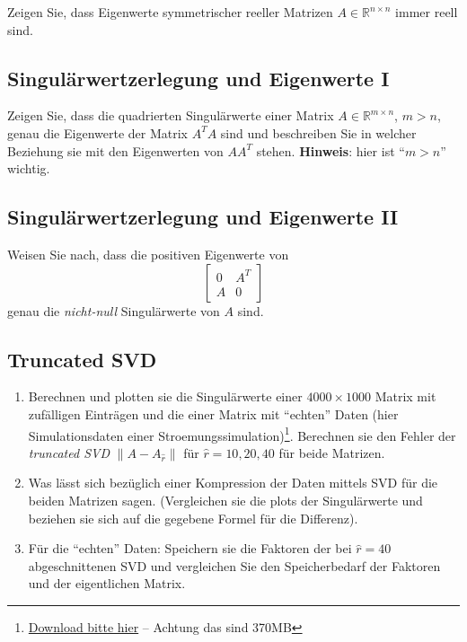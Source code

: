 \documentclass[
]{book}
\providecommand{\tightlist}{%
  \setlength{\itemsep}{0pt}\setlength{\parskip}{0pt}}
\theoremstyle{definition}
\theoremstyle{definition}
\theoremstyle{definition}
\theoremstyle{definition}
\theoremstyle{remark}
\begin{document}
Zeigen Sie, dass Eigenwerte symmetrischer reeller Matrizen \(A\in \mathbb R^{n\times n}\) immer reell sind.

\hypertarget{singuluxe4rwertzerlegung-und-eigenwerte-i}{%
\subsection{Singulärwertzerlegung und Eigenwerte I}\label{singuluxe4rwertzerlegung-und-eigenwerte-i}}

Zeigen Sie, dass die quadrierten Singulärwerte einer Matrix \(A\in \mathbb R^{m\times n}\), \(m>n\), genau die Eigenwerte der Matrix \(A^TA\) sind und beschreiben Sie in welcher Beziehung sie mit den Eigenwerten von \(AA^T\) stehen. \textbf{Hinweis}: hier ist ``\(m>n\)'' wichtig.

\hypertarget{singuluxe4rwertzerlegung-und-eigenwerte-ii}{%
\subsection{Singulärwertzerlegung und Eigenwerte II}\label{singuluxe4rwertzerlegung-und-eigenwerte-ii}}

Weisen Sie nach, dass die positiven Eigenwerte von
\begin{equation*}
\begin{bmatrix}
0 & A^T \\ A & 0
\end{bmatrix}
\end{equation*}
genau die \emph{nicht-null} Singulärwerte von \(A\) sind.

\hypertarget{truncated-svd}{%
\subsection{Truncated SVD}\label{truncated-svd}}

\begin{enumerate}
\def\labelenumi{\arabic{enumi}.}
\tightlist
\item
  Berechnen und plotten sie die Singulärwerte einer \(4000\times 1000\) Matrix mit zufälligen Einträgen und die einer Matrix mit ``echten'' Daten (hier Simulationsdaten einer Stroemungssimulation)\footnote{ \href{https://cloud.tu-ilmenau.de/s/pAMyTmK5YA5t9dg}{Download bitte hier} -- Achtung das sind 370MB}. Berechnen sie den Fehler der \emph{truncated SVD} \(\|A-A_{\hat r}\|\) für \(\hat r = 10, 20, 40\) für beide Matrizen.
\item
  Was lässt sich bezüglich einer Kompression der Daten mittels SVD für die beiden Matrizen sagen. (Vergleichen sie die plots der Singulärwerte und beziehen sie sich auf die gegebene Formel für die Differenz).
\item
  Für die ``echten'' Daten: Speichern sie die Faktoren der bei \(\hat r=40\) abgeschnittenen SVD und vergleichen Sie den Speicherbedarf der Faktoren und der eigentlichen Matrix.
\end{enumerate}
\end{document}
